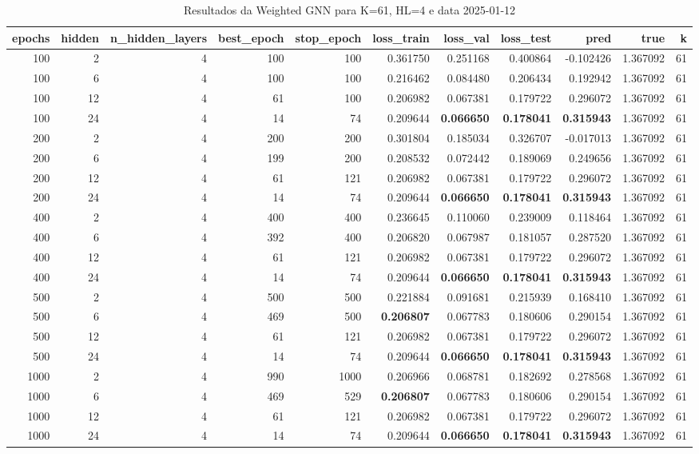 \begin{table}
\caption{Resultados da Weighted GNN para K=61, HL=4 e data 2025-01-12}
\label{tab:weighted_gnn_results_k61_hl4_d20250112}
\begin{tabular}{rrrrrrrrrrr}
\toprule
epochs & hidden & n\_hidden\_layers & best\_epoch & stop\_epoch & loss\_train & loss\_val & loss\_test & pred & true & k \\
\midrule
100 & 2 & 4 & 100 & 100 & 0.361750 & 0.251168 & 0.400864 & -0.102426 & 1.367092 & 61 \\
100 & 6 & 4 & 100 & 100 & 0.216462 & 0.084480 & 0.206434 & 0.192942 & 1.367092 & 61 \\
100 & 12 & 4 & 61 & 100 & 0.206982 & 0.067381 & 0.179722 & 0.296072 & 1.367092 & 61 \\
100 & 24 & 4 & 14 & 74 & 0.209644 & \textbf{0.066650} & \textbf{0.178041} & \textbf{0.315943} & 1.367092 & 61 \\
200 & 2 & 4 & 200 & 200 & 0.301804 & 0.185034 & 0.326707 & -0.017013 & 1.367092 & 61 \\
200 & 6 & 4 & 199 & 200 & 0.208532 & 0.072442 & 0.189069 & 0.249656 & 1.367092 & 61 \\
200 & 12 & 4 & 61 & 121 & 0.206982 & 0.067381 & 0.179722 & 0.296072 & 1.367092 & 61 \\
200 & 24 & 4 & 14 & 74 & 0.209644 & \textbf{0.066650} & \textbf{0.178041} & \textbf{0.315943} & 1.367092 & 61 \\
400 & 2 & 4 & 400 & 400 & 0.236645 & 0.110060 & 0.239009 & 0.118464 & 1.367092 & 61 \\
400 & 6 & 4 & 392 & 400 & 0.206820 & 0.067987 & 0.181057 & 0.287520 & 1.367092 & 61 \\
400 & 12 & 4 & 61 & 121 & 0.206982 & 0.067381 & 0.179722 & 0.296072 & 1.367092 & 61 \\
400 & 24 & 4 & 14 & 74 & 0.209644 & \textbf{0.066650} & \textbf{0.178041} & \textbf{0.315943} & 1.367092 & 61 \\
500 & 2 & 4 & 500 & 500 & 0.221884 & 0.091681 & 0.215939 & 0.168410 & 1.367092 & 61 \\
500 & 6 & 4 & 469 & 500 & \textbf{0.206807} & 0.067783 & 0.180606 & 0.290154 & 1.367092 & 61 \\
500 & 12 & 4 & 61 & 121 & 0.206982 & 0.067381 & 0.179722 & 0.296072 & 1.367092 & 61 \\
500 & 24 & 4 & 14 & 74 & 0.209644 & \textbf{0.066650} & \textbf{0.178041} & \textbf{0.315943} & 1.367092 & 61 \\
1000 & 2 & 4 & 990 & 1000 & 0.206966 & 0.068781 & 0.182692 & 0.278568 & 1.367092 & 61 \\
1000 & 6 & 4 & 469 & 529 & \textbf{0.206807} & 0.067783 & 0.180606 & 0.290154 & 1.367092 & 61 \\
1000 & 12 & 4 & 61 & 121 & 0.206982 & 0.067381 & 0.179722 & 0.296072 & 1.367092 & 61 \\
1000 & 24 & 4 & 14 & 74 & 0.209644 & \textbf{0.066650} & \textbf{0.178041} & \textbf{0.315943} & 1.367092 & 61 \\
\bottomrule
\end{tabular}
\end{table}


